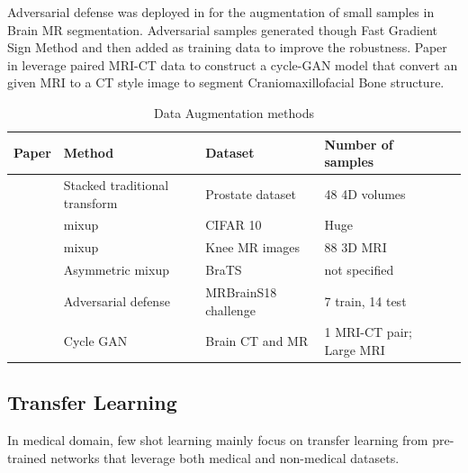 Adversarial defense was deployed in \cite{suk_brain_2019} for the augmentation of small samples in Brain MR segmentation. Adversarial samples generated though Fast Gradient Sign Method\cite{goodfellow_explaining_2015} and then added as training data to improve the robustness. Paper in \cite{chen_one-shot_2020} leverage paired MRI-CT data to construct a cycle-GAN model that convert an given MRI to a CT style image to segment Craniomaxillofacial Bone structure.\\

\begin{table}
\begin{tabular}{lllll}
\hline
Paper                                             & Method                        & Dataset              & Number of samples &  \\
\hline
\cite{zhang_when_2019}       & Stacked traditional transform & Prostate dataset     & 48 4D volumes     &  \\
\cite{zhang_mixup_2018}       & mixup                         & CIFAR 10             & Huge              &  \\
\cite{panfilov_improving_2019} & mixup                         & Knee MR images       & 88 3D MRI         &  \\
\cite{li_overfitting_2019}   & Asymmetric mixup              & BraTS               &  not specified             &  \\
\cite{suk_brain_2019}                    & Adversarial defense           & MRBrainS18 challenge & 7 train, 14 test  &  \\
\cite{chen_one-shot_2020} &  Cycle GAN &  Brain CT and MR&1 MRI-CT pair; Large MRI\\
\hline
\end{tabular}
\caption{Data Augmentation methods}
\label{tab:Augtable}
\end{table}

\subsection{Transfer Learning}
In medical domain, few shot learning mainly focus on transfer learning from pre-trained networks that leverage both medical and non-medical datasets.\\


